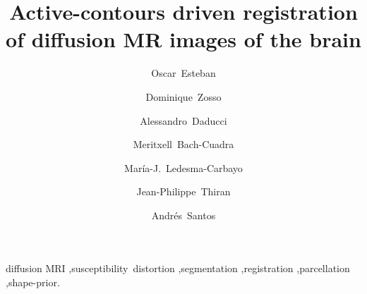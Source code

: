 \documentclass[5p,authoryear]{elsarticle}
\begin{document}
\begin{frontmatter}


\title{Active-contours driven registration of diffusion MR images of the brain}

\author[bit]{Oscar~Esteban}
\author[ucla]{Dominique~Zosso}
\author[lts5]{Alessandro~Daducci}
\author[chuv,lts5]{Meritxell~Bach-Cuadra}
\author[bit]{Mar\'ia-J.~Ledesma-Carbayo}
\author[lts5]{Jean-Philippe~Thiran}
\author[bit]{Andr\'es~Santos}


\address[bit]{Biomedical Image Technologies (BIT), ETSI Telecomunicaci\'on, %
Universidad Polit\'ecnica de Madrid and CIBER-BBN, Madrid, Spain}
\address[ucla]{Department of Mathematics, University of California,
Los Angeles (UCLA), Los Angeles, CA, US}
\address[lts5]{Signal Processing Laboratory (LTS5), \'Ecole Polytechnique
F\'ed\'erale de Lausanne (EPFL), Lausanne, Switzerland}
\address[chuv]{Dept. of Radiology, University
Hospital Center (CHUV) and University of Lausanne (UNIL), Lausanne, Switzerland}

\begin{abstract}

\end{abstract}

\begin{keyword}
diffusion MRI \sep susceptibility~distortion \sep segmentation %
\sep registration \sep parcellation \sep shape-prior.
\end{keyword}

\end{frontmatter}

\linenumbers










%



\appendix

\end{document}
